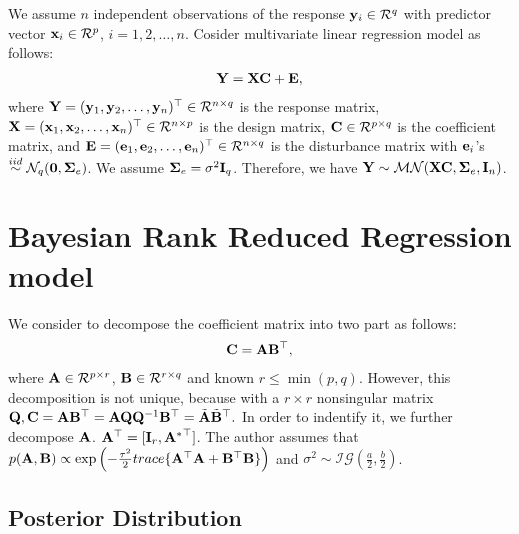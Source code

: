 \documentclass[]{book}
\begin{document}
We assume \(n\) independent observations of the response \({\bf y}_i\in \mathcal{R}^q\) with predictor vector
\({\bf x}_i\in\mathcal{R}^p\), \(i=1,2,\ldots,n\). Cosider multivariate linear regression model as follows:
\begin{eqnarray}
    {\bf Y}={\bf X}{\bf C}+ {\bf E},
    \label{eq:eq1}
    \end{eqnarray}
where \({\bf Y}=({\bf y}_1,{\bf y}_2,\ldots,{\bf y}_n)^{{\top}}\in\mathcal{R}^{n\times q}\) is the response matrix, \({\bf X}=({\bf x}_1,{\bf x}_2,\ldots,{\bf x}_n)^{{\top}}\in\mathcal{R}^{n\times p}\) is the design matrix, \({\bf C}\in\mathcal{R}^{p\times q}\) is the coefficient matrix, and \({\bf E}=({\bf e}_1,{\bf e}_2,\ldots,{\bf e}_n)^{{\top}}\in\mathcal{R}^{n\times q}\) is the disturbance matrix with \({\bf e}_i\)'s \(\overset{iid}{\sim}\mathcal{N}_q({\bf 0},{\boldsymbol \Sigma}_e)\). We assume \({\boldsymbol \Sigma}_e=\sigma^2{\bf I}_q\). Therefore, we have \({\bf Y}\sim\mathcal{MN}({\bf X}{\bf C},{\boldsymbol \Sigma}_e,{\bf I}_n)\).

\hypertarget{bayesian-rank-reduced-regression-model}{%
\section{Bayesian Rank Reduced Regression model}\label{bayesian-rank-reduced-regression-model}}

We consider to decompose the coefficient matrix into two part as follows:
\begin{eqnarray}
     {\bf C}={\bf A}{\bf B}^{{\top}},
\end{eqnarray}
where \({\bf A}\in\mathcal{R}^{p\times r}\), \({\bf B}\in\mathcal{R}^{r\times q}\) and known \(r\leq \min(p,q)\).
However, this decomposition is not unique, because with a \(r\times r\) nonsingular matrix \({\bf Q}, {\bf C}={\bf A}{\bf B}^{{\top}}={\bf A}{\bf Q}{\bf Q}^{-1}{\bf B}^{{\top}}=\tilde{{\bf A}}\tilde{{\bf B}}^{{\top}}.\)
In order to indentify it, we further decompose \({\bf A}\). \({\bf A}^{{\top}}=[{\bf I}_r, {{\bf A}^*}^{{\top}}]\). The author assumes that \(p({\bf A},{\bf B})\propto\exp\left(-\frac{\tau^2}{2} trace\{ {\bf A}^{{\top}}{\bf A}+{\bf B}^{{\top}}{\bf B}\}\right)\) and \(\sigma^2\sim \mathcal{IG}(\frac{a}{2},\frac{b}{2})\).

\hypertarget{posterior-distribution}{%
\subsection{Posterior Distribution}\label{posterior-distribution}}
\end{document}
